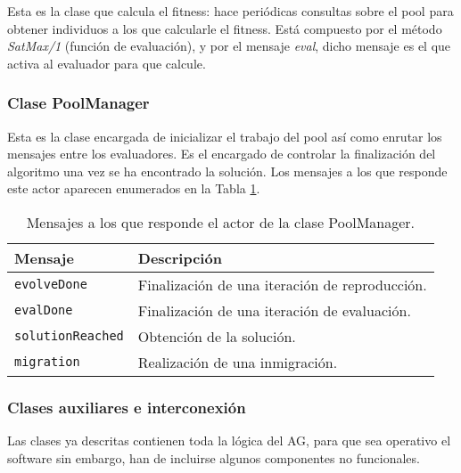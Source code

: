 Esta es la clase que calcula el fitness: hace periódicas consultas sobre el pool para obtener individuos a los que calcularle el fitness. Está compuesto por el método {\em SatMax/1} (función de evaluación), y por el mensaje {\em eval}, dicho mensaje es el que activa al evaluador para que calcule.

\subsubsection{Clase PoolManager}

Esta es la clase encargada de inicializar el trabajo del pool así como enrutar los mensajes entre los evaluadores. Es el encargado de controlar la finalización del algoritmo una vez se ha encontrado la solución.  Los mensajes a los que responde este actor aparecen enumerados en la Tabla \ref{tb:scl:poolManager}.

\begin{table}
  \caption{Mensajes a los que responde el actor de la clase PoolManager.}\label{tb:scl:poolManager}
  \centering
\begin{tabular}{|p{3cm}|p{7cm}|}
  \hline
   \textbf{Mensaje} &  \textbf{Descripción} \\
  \hline
  {\tt evolveDone } & Finalización de una iteración de reproducción. \\
  \hline
  {\tt evalDone} & Finalización de una iteración de evaluación. \\
  \hline
 {\tt solutionReached} & Obtención de la solución. \\
  \hline
  {\tt migration} & Realización de una inmigración. \\
  \hline
\end{tabular}
\end{table}


\subsubsection{Clases auxiliares e interconexión}

Las clases ya descritas contienen toda la lógica del AG, para que sea operativo el software sin embargo, han de incluirse algunos componentes no funcionales.

\vspace{.35cm}

